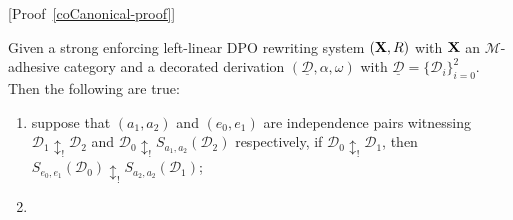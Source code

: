 \documentclass[a4paper,UKenglish,cleveref,pdftex,thm-restate,numberwithinsect,anonymous]{lipics}
\def\R{\mathsf{R}}
\def\X{\textbf {\textup{X}}}
\newcommand{\dder}[1]{\mathscr{#1}}
\newcommand{\der}[1]{\underline{\dder{#1}}}
\begin{document}
[Proof~\ref{coCanonical-proof}]

\iffalse
	\begin{corollary} Given a strong enforcing  left-linear DPO rewriting system  $(\X,\R)$ with $\X$ an $\mathcal{M}$-adhesive category and a decorated derivation $(\der{D}, \alpha, \omega)$ with $\der{D}=\{\dder{D}_i\}_{i=0}^2$. Then the following are true:
		\begin{enumerate}
			\item suppose that $(a_1,a_2)$ and $(e_0,e_1)$ are independence pairs witnessing  $\dder{D}_1\updownarrow_! \dder{D}_2$ and $\dder{D}_0\updownarrow_! S_{a_1,a_2}(\dder{D}_2)$ respectively, if $\dder{D}_0\updownarrow_!\dder{D}_1$, then $S_{e_0,e_1}(\dder{D}_0)\updownarrow_!S_{a_2,a_2}(\dder{D}_1)$;
			\item
		\end{enumerate}
	\end{corollary}
\end{document}
